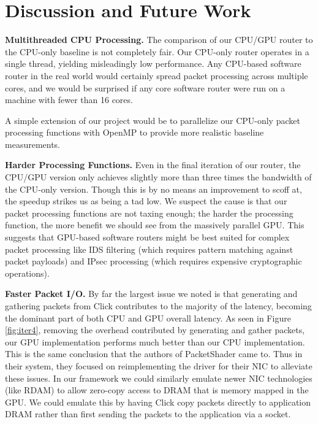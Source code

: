 \section{Discussion and Future Work}
\label{sec:disc}

\noindent \textbf{Multithreaded CPU Processing.} The comparison of our CPU/GPU
router to the CPU-only baseline is not completely fair. Our CPU-only router
operates in a single thread, yielding misleadingly low performance. Any
CPU-based software router in the real world would certainly spread packet
processing across multiple cores, and we would be surprised if any core
software router were run on a machine with fewer than 16 cores.

A simple extension of our project would be to parallelize our CPU-only packet
processing functions with OpenMP to provide more realistic baseline
measurements.

\medskip \noindent \textbf{Harder Processing Functions.} Even in the final
iteration of our router, the CPU/GPU version only achieves slightly more than
three times the bandwidth of the CPU-only version. Though this is by no means
an improvement to scoff at, the speedup strikes us as being a tad low. We
suspect the cause is that our packet processing functions are not taxing
enough; the harder the processing function, the more benefit we should see from
the massively parallel GPU. This suggests that GPU-based software routers might
be best suited for complex packet processing like IDS filtering (which requires
pattern matching against packet payloads) and IPsec processing (which requires
expensive cryptographic operations).

\medskip \noindent \textbf{Faster Packet I/O.} By far the largest issue we noted
is that generating and gathering packets from Click contributes to the majority
of the latency, becoming the dominant part of both CPU and GPU overall
latency. As seen in Figure \ref{fig:iter4}, removing the overhead contributed by
generating and gather packets, our GPU implementation performs much better than
our CPU implementation. This is the same conclusion that the authors of
PacketShader \cite{Han} came to. Thus in their system, they focused on
reimplementing the driver for their NIC to alleviate these issues. In our
framework we could similarly emulate newer NIC technologies (like RDAM) to allow
zero-copy access to DRAM that is memory mapped in the GPU. We could emulate this
by having Click copy packets directly to application DRAM rather than first
sending the packets to the application via a socket.

